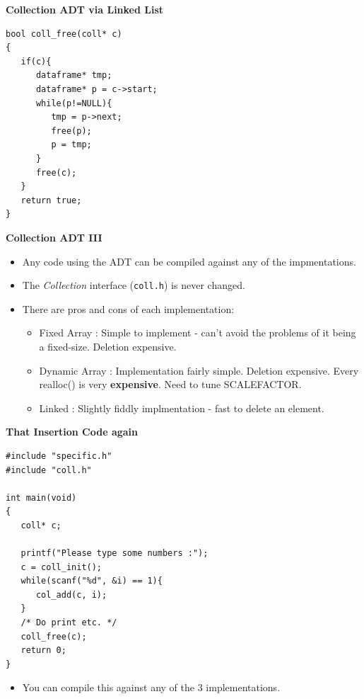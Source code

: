 \documentclass[a4,portraitt]{slides}
\begin{document}
\newpage
{\samepage
\begin{center}
{\large{\bf Collection ADT via Linked List}}
\end{center}
{\small
\begin{verbatim}
bool coll_free(coll* c)
{
   if(c){
      dataframe* tmp;
      dataframe* p = c->start;
      while(p!=NULL){
         tmp = p->next;
         free(p);
         p = tmp;
      }
      free(c);
   }
   return true;
}
\end{verbatim}
}}


\newpage
{\samepage
\begin{center}
{\large{\bf Collection ADT III}}
\end{center}
\begin{itemize}
\item Any code using the ADT can be compiled against any of the impmentations. 
\item The {\em Collection} interface ({\tt coll.h}) is never changed.
\item There are pros and cons of each implementation:
\begin{itemize}
\item Fixed Array : Simple to implement - can't avoid the problems of it being a fixed-size. Deletion expensive.
\item Dynamic Array : Implementation fairly simple. Deletion expensive. Every realloc() is very {\bf expensive}. Need to tune SCALEFACTOR. 
\item Linked : Slightly fiddly implmentation - fast to delete an element.
\end{itemize}
\end{itemize}
}

\newpage
{\samepage
\begin{center}
{\large{\bf That Insertion Code again}}
\end{center}
\begin{verbatim}
#include "specific.h"
#include "coll.h"

int main(void)
{
   coll* c;

   printf("Please type some numbers :");
   c = coll_init();
   while(scanf("%d", &i) == 1){
      col_add(c, i);
   }
   /* Do print etc. */
   coll_free(c);
   return 0;
}
\end{verbatim}
\begin{itemize}
\item You can compile this against any of the $3$ implementations.
\end{itemize}
}
\end{document}
